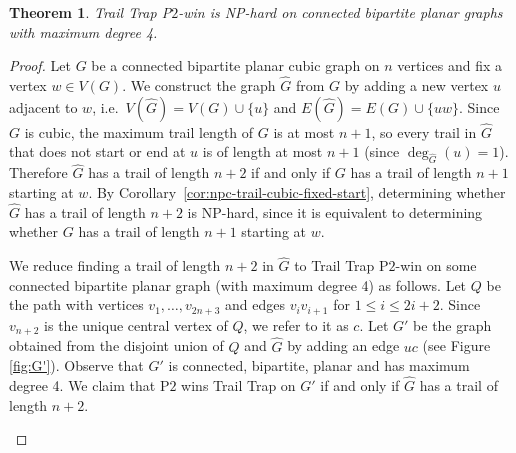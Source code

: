 \documentclass{article}
\theoremstyle{plain}
\newtheorem{theorem}{Theorem}
\theoremstyle{definition}
\def\ptwo{{\rm{P}\ensuremath{2}}}
\begin{document}
\begin{theorem}
    \label{thm:NP}
    {\sc Trail Trap \ptwo{}-win} is NP-hard  on connected bipartite planar graphs with maximum degree 4.
\end{theorem}
\begin{proof}
    Let $G$ be a connected bipartite planar cubic graph on $n$ vertices and fix a vertex $w \in V(G)$. We construct the graph $\widehat{G}$ from $G$ by adding a new vertex $u$ adjacent to $w$, i.e.~$V(\widehat{G}) = V(G)\cup\{u\}$ and $E(\widehat{G}) = E(G)\cup\{uw\}$. Since $G$ is cubic, the maximum trail length of $G$ is at most $n+1$, so every trail in $\widehat{G}$ that does not start or end at $u$ is of length at most $n+1$ (since $\deg_{\widehat{G}}(u) = 1$). Therefore $\widehat{G}$ has a trail of length $n+2$ if and only if $G$ has a trail of length $n+1$ starting at $w$. By Corollary~\ref{cor:npc-trail-cubic-fixed-start}, determining whether $\widehat{G}$ has a trail of length $n+2$ is NP-hard, since it is equivalent to determining whether $G$ has a trail of length $n+1$ starting at $w$.

    We reduce finding a trail of length $n+2$ in $\widehat{G}$ to {\sc Trail Trap \ptwo{}-win} on some connected bipartite planar graph (with maximum degree 4)  as follows. Let $Q$ be the path with vertices $v_1, \ldots, v_{2n+3}$ and edges $v_i v_{i+1}$ for $1 \le i \le 2i+2$. Since $v_{n+2}$ is the unique central vertex of $Q$, we refer to it as $c$. Let $G'$ be the graph obtained from the disjoint union of $Q$ and $\widehat{G}$ by adding an edge $u c$ (see Figure \ref{fig:G'}). Observe that $G'$ is connected, bipartite, planar and has maximum degree 4. We claim that \ptwo{} wins {\sc Trail Trap} on $G'$ if and only if $\widehat{G}$ has a trail of length $n+2$.

\begin{figure}[h!!]
\centering
{}
\end{figure}
\end{proof}
\end{document}
